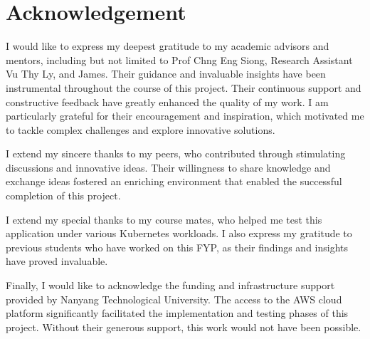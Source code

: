 
\chapter*{Acknowledgement}

I would like to express my deepest gratitude to my academic advisors and mentors, including but not limited to Prof Chng Eng Siong, Research Assistant Vu Thy Ly, and James. Their guidance and invaluable insights have been instrumental throughout the course of this project. Their continuous support and constructive feedback have greatly enhanced the quality of my work. I am particularly grateful for their encouragement and inspiration, which motivated me to tackle complex challenges and explore innovative solutions.

I extend my sincere thanks to my peers, who contributed through stimulating discussions and innovative ideas. Their willingness to share knowledge and exchange ideas fostered an enriching environment that enabled the successful completion of this project.

I extend my special thanks to my course mates, who helped me test this application under various Kubernetes workloads. I also express my gratitude to previous students who have worked on this FYP, as their findings and insights have proved invaluable.

Finally, I would like to acknowledge the funding and infrastructure support provided by Nanyang Technological University. The access to the AWS cloud platform significantly facilitated the implementation and testing phases of this project. Without their generous support, this work would not have been possible.









